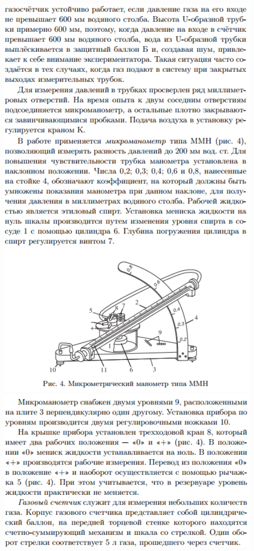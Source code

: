 \documentclass[12pt]{article}
\begin{document}
\begin{center}
    	\includegraphics[width=16cm]{theory_7.png}
    	\includegraphics[width=16cm]{theory_8.png}
    \end{center}
    
\end{document}
